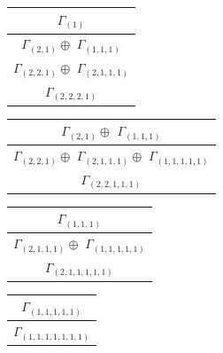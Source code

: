 \documentclass[main.tex]{subfiles}
\begin{document}
\begin{minipage}{.3\textwidth}
\centering
\begin{tabular}{c}
$\Gamma_{(
1
)}$
\\ \hline
$\Gamma_{(
2 , 
1
)} \oplus$
$\Gamma_{(
1 , 
1 , 
1
)}$
\\ \hline
$\Gamma_{(
2 , 
2 , 
1
)} \oplus$
$\Gamma_{(
2 , 
1 , 
1 , 
1
)}$
\\ \hline
$\Gamma_{(
2 , 
2 , 
2 , 
1
)}$
\\
\end{tabular}\end{minipage}
\bigskip
\begin{minipage}{.35\textwidth}
\centering
\begin{tabular}{c}
$\Gamma_{(
2 , 
1
)} \oplus$
$\Gamma_{(
1 , 
1 , 
1
)}$
\\ \hline
$\Gamma_{(
2 , 
2 , 
1
)} \oplus$
$\Gamma_{(
2 , 
1 , 
1 , 
1
)} \oplus$
$\Gamma_{(
1 , 
1 , 
1 , 
1 , 
1
)}$
\\ \hline
$\Gamma_{(
2 , 
2 , 
1 , 
1 , 
1
)}$
\\
\end{tabular}\end{minipage}
\begin{minipage}{.4\textwidth}
\centering
\begin{tabular}{c}
$\Gamma_{(
1 , 
1 , 
1
)}$
\\ \hline
$\Gamma_{(
2 , 
1 , 
1 , 
1
)} \oplus$
$\Gamma_{(
1 , 
1 , 
1 , 
1 , 
1
)}$
\\ \hline
$\Gamma_{(
2 , 
1 , 
1 , 
1 , 
1 , 
1
)}$
\\
\end{tabular}\end{minipage}
\begin{minipage}{.2\textwidth}
\centering
\begin{tabular}{c}
$\Gamma_{(
1 , 
1 , 
1 , 
1 , 
1
)}$
\\ \hline
$\Gamma_{(
1 , 
1 , 
1 , 
1 , 
1 , 
1 , 
1
)}$
\\
\end{tabular}\end{minipage}
\bigskip
\end{document}
